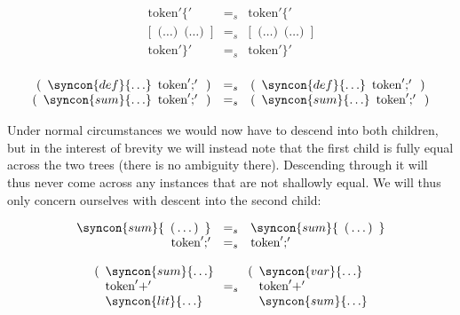 \documentclass{kththesis}
\begin{document}
$$
\begin{array}{rcl}
\text{token}'\{' & =_s & \text{token}'\{' \\

\text{[} \enspace \text{(} \ldots \text{)} \enspace \text{(} \ldots \text{)} \enspace \text{]}
& =_s &
\text{[} \enspace \text{(} \ldots \text{)} \enspace \text{(} \ldots \text{)} \enspace \text{]} \\

\text{token}'\}' & =_s & \text{token}'\}' \\
\end{array}
$$

$$
\begin{array}{rcl}
\text{(} \enspace \syncon{def}\{\ldots\} \enspace \text{token}';' \enspace \text{)}
& =_s &
\text{(} \enspace \syncon{def}\{\ldots\} \enspace \text{token}';' \enspace \text{)} \\
\text{(} \enspace \syncon{sum}\{\ldots\} \enspace \text{token}';' \enspace \text{)}
& =_s &
\text{(} \enspace \syncon{sum}\{\ldots\} \enspace \text{token}';' \enspace \text{)} \\
\end{array}
$$

Under normal circumstances we would now have to descend into both children, but in the interest of brevity we will instead note that the first child is fully equal across the two trees (there is no ambiguity there). Descending through it will thus never come across any instances that are not shallowly equal. We will thus only concern ourselves with descent into the second child:

$$
\begin{array}{rcl}
\syncon{sum}\{ \enspace \text{(} \ldots \text{)} \enspace \}
& =_s &
\syncon{sum}\{ \enspace \text{(} \ldots \text{)} \enspace \} \\

\text{token}';' & =_s & \text{token}';' \\
\end{array}
$$

$$
\begin{array}{l}
\text{(} \enspace \syncon{sum}\{\ldots\} \\
\hphantom{\text{(}} \enspace \text{token}'+' \\
\hphantom{\text{(}} \enspace \syncon{lit}\{\ldots\} \\
\end{array}
=_s
\begin{array}{l}
\text{(} \enspace \syncon{var}\{\ldots\} \\
\hphantom{\text{(}} \enspace \text{token}'+' \\
\hphantom{\text{(}} \enspace \syncon{sum}\{\ldots\} \\
\end{array}
$$
\end{document}
